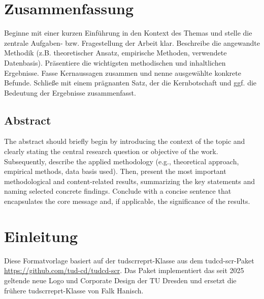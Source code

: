 \documentclass[fontsize=12pt,BCOR=12mm,logo/language=de]{tudcdreprt}
\begin{document}
\chapter*{Zusammenfassung}

\pagestyle{plain} %


Beginne mit einer kurzen Einführung in den Kontext des Themas und stelle die zentrale Aufgaben- bzw. Fragestellung der Arbeit klar.
Beschreibe die angewandte Methodik (z.B. theoretischer Ansatz, empirische Methoden, verwendete Datenbasis).
Präsentiere die wichtigsten methodischen und inhaltlichen Ergebnisse.
Fasse Kernaussagen zusammen und nenne ausgewählte konkrete Befunde.
Schließe mit einem prägnanten Satz, der die Kernbotschaft und ggf. die Bedeutung der Ergebnisse zusammenfasst.

\section*{Abstract}

The abstract should briefly begin by introducing the context of the topic and clearly stating the central research question or objective of the work.
Subsequently, describe the applied methodology (e.g., theoretical approach, empirical methods, data basis used).
Then, present the most important methodological and content-related results, summarizing the key statements and naming selected concrete findings.
Conclude with a concise sentence that encapsulates the core message and, if applicable, the significance of the results.


\tableofcontents

\listoffigures

\listoftables


\setcounter{page}{1} 

\chapter{Einleitung}

Diese Formatvorlage basiert auf der tudscrreprt-Klasse aus dem tudcd-scr-Paket 
\url{https://github.com/tud-cd/tudcd-scr}. Das Paket implementiert das seit 2025 
geltende neue Logo und Corporate Design der TU Dresden und ersetzt die frühere 
tudscrreprt-Klasse von Falk Hanisch.
\end{document}
